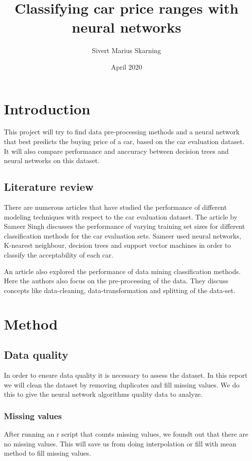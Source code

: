 \documentclass[a4paper, 12pt]{article}
\title{Classifying car price ranges with neural networks}
\author{Sivert Marius Skarning}
\date{April 2020}
\begin{document}
\maketitle
\clearpage
\tableofcontents
\clearpage
{}

\section{Introduction}
This project will try to find data pre-processing methods and a neural network that best predicts the buying price of a car, based on the car evaluation dataset.
It will also compare performance and anccuracy between decision trees and neural networks on this dataset.
\subsection{Literature review}
There are numerous articles that have studied the performance of different modeling techniques with respect to the car evaluation dataset. The article by Sameer Singh\cite{singh2005modeling} discusses the performance of varying training set sizes for different classification methods for the car evaluation sets. Sameer used neural networks, K-nearest neighbour, decision trees and support vector machines in order to classify the acceptability of each car.


An article\cite{perf} also explored the performance of data mining classification methods. Here the authors also focus on the pre-processing of the data. They discuss concepts like data-cleaning, data-transformation and splitting of the data-set.

\section{Method}

\subsection{Data quality}
In order to ensure data quality it is necessary to assess the dataset. In this report we will clean the dataset by removing duplicates and fill missing values. We do this to give the neural network algorithms quality data to analyze\cite{quality}.
\subsubsection{Missing values}
After running an r script that counts missing values, we foundt out that there are no missing values. This will save us from doing interpolation or fill with mean method to fill missing values.
\end{document}
